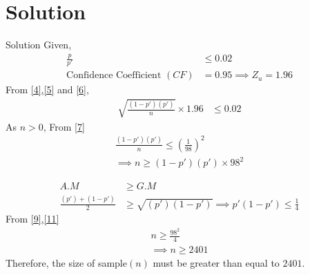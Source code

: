 \documentclass{beamer}
\begin{document}
\section{Solution}
\begin{frame}{Solution}
    Given,\\
    \begin{align}
        \frac{p}{p'} &\leq 0.02 \label{5}\\
       \text{Confidence Coefficient } (CF) &= 0.95
        \implies Z_u = 1.96 \label{6}
    \end{align}
From \eqref{4},\eqref{5} and \eqref{6},
    \begin{align}
        \sqrt{\frac{(1-p')(p')}{n}} \times 1.96 & \leq 0.02 \label{7}
    \end{align}
As $n >0 $, From \eqref{7}
    \begin{align}
        \frac{(1-p')(p')}{n} \leq \left(\frac{1}{98}\right)^2\\
        \implies n \geq {(1-p')(p')} \times 98^2 \label{9}
    \end{align}

\end{frame}
\begin{frame}{}
\begin{align}
    A.M &\geq G.M\\
    \frac{(p')+(1-p')}{2} &\geq \sqrt{(p')(1-p')}
    \implies p'(1-p') \leq \frac{1}{4} \label{11}
\end{align}
    From \eqref{9},\eqref{11}
    \begin{align}
        n \geq \frac{98^2}{4}\\
        \implies n \geq 2401
    \end{align}
Therefore,
the size of sample$(n)$ must be greater than equal to $2401$.
\end{frame}
\end{document}
